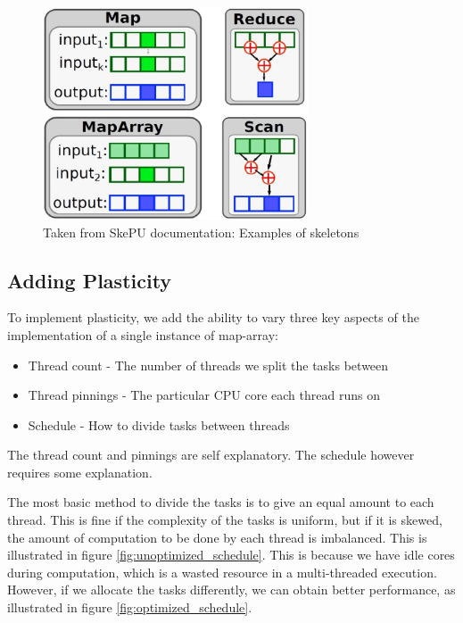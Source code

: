 \begin{figure}
	\centering
	\includegraphics[width=0.7\textwidth]{graphics/skepu_skeletons.jpg}
	\caption{Taken from SkePU documentation: Examples of skeletons}
	\label{fig:skepu_skeletons}
\end{figure}



\subsection{Adding Plasticity}
\label{subsection:design_adding_plasticity}

To implement plasticity, we add the ability to vary three key aspects of the implementation of a single instance of map-array:

\begin{itemize}
	\item Thread count - The number of threads we split the tasks between
	\item Thread pinnings - The particular CPU core each thread runs on
	\item Schedule - How to divide tasks between threads
\end{itemize}

The thread count and pinnings are self explanatory. The schedule however requires some explanation.

The most basic method to divide the tasks is to give an equal amount to each thread. This is fine if the complexity of the tasks is uniform, but if it is skewed, the amount of computation to be done by each thread is imbalanced. This is illustrated in figure \ref{fig:unoptimized_schedule}. This is because we have idle cores during computation, which is a wasted resource in a multi-threaded execution. However, if we allocate the tasks differently, we can obtain better performance, as illustrated in figure \ref{fig:optimized_schedule}.

